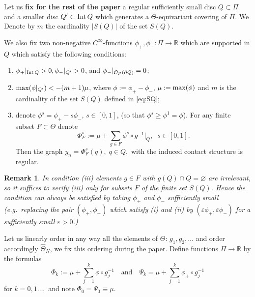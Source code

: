 \documentclass[12pt]{paper}
\theoremstyle{plain}
\newtheorem{remark}[theorem]{Remark}
\theoremstyle{definition}
\newcommand{\wh}{\widehat}
\newcommand{\p}{\partial}
\newcommand{\eps}{\varepsilon}
\newcommand{\R}{{\mathbb{R}}}
\newcommand{\Int}{{\rm Int\,}} %
\renewcommand{\max}{{\rm max}}
\def\Op{{\mathcal O}{\it p}\,}
\numberwithin{figure}{section}
\begin{document}
  Let  us {\bf fix for the rest of the paper}  a regular sufficiently small disc $Q\subset\Pi$  and a smaller disc $Q^\prime\subset \Int Q$ which generates a $\Theta$-equivariant covering of $\Pi$.  We Denote by $m$ the cardinality $|S(Q)|$ of the set $S(Q)$.
  
 We also fix  two non-negative    $C^\infty$-functions $\phi_+,\phi_-:\Pi \to \R$   which are  supported in $Q$ which satisfy the following conditions:
  \begin{enumerate}
 \item $\phi_+|_{\Int Q}>0, \phi_-|_{ Q^\prime}>0$, and $\phi_-|_{\Op(\p Q)} = 0$;
 \item  $\max(\phi|_{Q^\prime}) < -(m+1)\mu $, where $\phi:=\phi_+-\phi_-$,\; $\mu:=\max(\phi)$ and  $m$ is  the cardinality of the set $S(Q)$ defined in \eqref{eq:SQ};
 \item   denote $\phi^s=\phi_+-s\phi_-$, $s\in[0,1]$, (so that $\phi^s\geq\phi^1=\phi$). For any finite subset $F\subset \Theta$ denote
 $$\Phi^s_F:=\mu+\sum\limits_{g\in F} \phi^s\circ g^{-1}|_Q,\;  
   \; s\in[0,1].$$
 Then the graph  $y_n= \Phi^{s}_F(q),\; q\in Q,$ with the induced contact structure is regular.
\end{enumerate}

\begin{remark}{\rm
  In condition (iii) elements $g\in F$ with $g(Q) \cap Q=\varnothing$ are irrelevant, so it suffices to verify (iii) only for    subsets $F$ of the  finite set $ S(Q)$. Hence the condition can always be satisfied  by taking $\phi_+$ and $\phi_-$ sufficiently small (e.g.\ replacing the pair $(\phi_+,\phi_-)$ which satisfy (i) and (ii) by $(\eps\phi_+,\eps\phi_-)$ for a sufficiently small $\eps>0$.)  }
\end{remark}
 
Let us linearly order in any way all the elements of $\Theta$:
$g_1,g_2,\dots $ and order accordingly $\wh\Theta_N$, we fix this ordering during the paper. Define functions $\Pi \to \R$ by the formulas
$$
	\Phi_k:= \mu+ \sum\limits_{j=1}^k\phi\circ g_j^{-1}  \quad\mbox{and}\quad
	\Psi_k= \mu+ \sum\limits_{j=1}^k\phi_+\circ g_j^{-1} 
$$
for $k=0,1\dots,  $ and note $\Phi_0=\Psi_0\equiv \mu$. 
   
\end{document}
